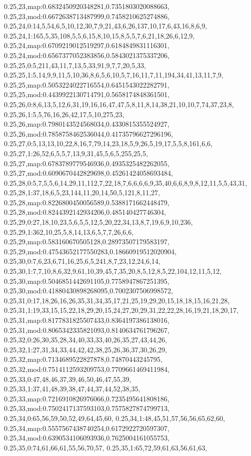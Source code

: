 0.25,23,map:0.6832450920348281,0.7351803020088663,
0.25,23,mod:0.6672638713487999,0.7458210625274886,
0.25,24,0:14,5,54,6,5,10,12,30,7,9,21,43,6,26,137,10,17,6,43,16,8,6,9,
0.25,24,1:165,5,35,108,5,5,6,15,8,10,15,8,5,5,7,6,21,18,26,6,12,9,
0.25,24,map:0.6709219012519297,0.6184849831116301,
0.25,24,mod:0.6567377052383856,0.5843021375337206,
0.25,25,0:5,211,43,11,7,13,5,33,91,9,7,7,20,5,33,
0.25,25,1:5,14,9,9,11,5,10,36,8,6,5,6,10,5,7,16,11,7,11,194,34,41,13,11,7,9,
0.25,25,map:0.5053224022716554,0.6451543022282791,
0.25,25,mod:0.4439922130714791,0.5658174848361501,
0.25,26,0:8,6,13,5,12,6,31,19,16,16,47,47,5,8,11,8,14,38,21,10,10,7,74,37,23,8,
0.25,26,1:5,5,76,16,26,42,17,5,10,275,23,
0.25,26,map:0.7980143524568034,0.4330815355524927,
0.25,26,mod:0.7858758462536044,0.41735796627296196,
0.25,27,0:5,13,13,10,22,8,16,7,79,14,23,18,5,9,26,5,19,17,5,5,8,161,6,6,
0.25,27,1:26,52,6,5,5,7,13,9,31,45,5,6,5,255,25,5,
0.25,27,map:0.6783789779546936,0.4935325482262055,
0.25,27,mod:0.6090670442829698,0.45261424058693484,
0.25,28,0:5,7,5,5,6,14,29,11,112,7,22,18,7,6,6,6,6,9,35,40,6,6,8,9,8,12,11,5,5,43,31,
0.25,28,1:37,18,6,5,23,144,11,20,14,50,5,121,8,11,27,
0.25,28,map:0.8226800450056589,0.5388171662448479,
0.25,28,mod:0.8244392142934206,0.485140427746304,
0.25,29,0:27,18,10,23,5,6,5,5,12,5,20,22,34,13,8,7,19,6,9,10,236,
0.25,29,1:362,10,25,5,8,14,13,6,5,7,7,26,6,6,
0.25,29,map:0.583160670505128,0.28973507179583197,
0.25,29,mod:0.47543652177550283,0.18660919512020904,
0.25,30,0:7,6,23,6,71,16,25,6,5,241,8,7,23,12,24,6,14,
0.25,30,1:7,7,10,8,6,32,9,61,10,39,45,7,35,20,8,5,12,8,5,22,104,12,11,5,12,
0.25,30,map:0.5046851442691105,0.7758947867251395,
0.25,30,mod:0.41880430898268095,0.7002307506998572,
0.25,31,0:17,18,26,16,26,35,31,34,35,17,21,25,19,29,20,15,18,18,15,16,21,28,
0.25,31,1:19,33,15,15,22,18,29,20,15,24,27,20,29,31,22,22,28,16,19,21,18,20,17,
0.25,31,map:0.8177831825507433,0.8364197386138016,
0.25,31,mod:0.8065342335821093,0.8140634761796267,
0.25,32,0:26,30,35,28,34,40,33,33,40,26,35,27,43,44,26,
0.25,32,1:27,31,34,33,44,42,42,38,25,26,36,37,30,26,29,
0.25,32,map:0.7134689522827878,0.74870443245795,
0.25,32,mod:0.7514112593209753,0.7709661469411984,
0.25,33,0:47,48,46,37,39,46,50,46,47,55,39,
0.25,33,1:37,41,48,39,38,47,44,37,44,52,38,35,
0.25,33,map:0.7216910826976066,0.7235495641808186,
0.25,33,mod:0.7502417137593103,0.7575827874799713,
0.25,34,0:65,56,59,50,52,49,64,45,60,
0.25,34,1:48,45,51,57,56,56,65,62,60,
0.25,34,map:0.5557567438740254,0.6172922720597307,
0.25,34,mod:0.6390534106093936,0.7625004161055753,
0.25,35,0:74,61,66,61,55,56,70,57,
0.25,35,1:65,72,59,61,63,56,61,63,
